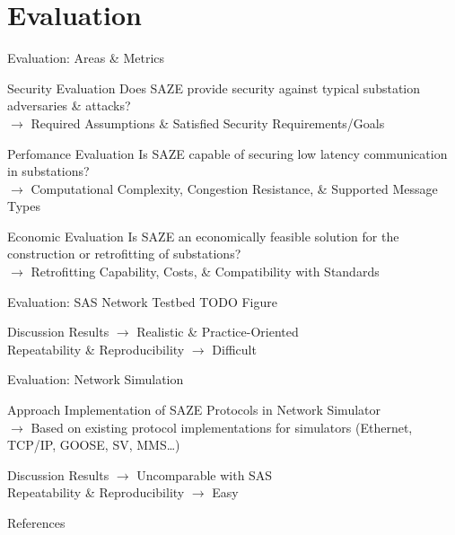 \documentclass[en]{sdqbeamer}
\begin{document}
\section{Evaluation}
\begin{frame}{Evaluation: Areas \& Metrics}
    \begin{greenblock}{Security Evaluation}
        Does SAZE provide security against typical substation adversaries \& attacks?
        \\$\rightarrow$ Required Assumptions \& Satisfied Security Requirements/Goals
    \end{greenblock}
    \begin{greenblock}{Perfomance Evaluation}
        Is SAZE capable of securing low latency communication in substations?
        \\$\rightarrow$ Computational Complexity, Congestion Resistance, \& Supported Message Types
    \end{greenblock}
    \begin{greenblock}{Economic Evaluation}
        Is SAZE an economically feasible solution for the construction or retrofitting of substations?
        \\$\rightarrow$ Retrofitting Capability, Costs, \& Compatibility with Standards
    \end{greenblock}
\end{frame}

\begin{frame}{Evaluation: SAS Network Testbed}
    TODO Figure
    \begin{blueblock}{Discussion}
        Results $\rightarrow$ Realistic \& Practice-Oriented 
        \\Repeatability \& Reproducibility $\rightarrow$ Difficult
    \end{blueblock}
\end{frame}

\begin{frame}{Evaluation: Network Simulation}
    \begin{greenblock}{Approach}
        Implementation of SAZE Protocols in Network Simulator
        \\$\rightarrow$ Based on existing protocol implementations for simulators (Ethernet, TCP/IP, GOOSE, SV, MMS\dots)
    \end{greenblock}
    \begin{blueblock}{Discussion}
        Results $\rightarrow$ Uncomparable with SAS
        \\Repeatability \& Reproducibility $\rightarrow$ Easy
    \end{blueblock}
\end{frame}

\appendix
\beginbackup

\begin{frame}[allowframebreaks]{References}
\printbibliography
\end{frame}

\backupend
\end{document}
